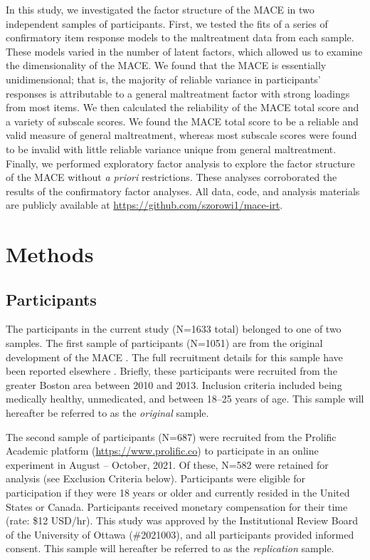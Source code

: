 \documentclass[letterpaper,man,natbib,floatsintext,longtable]{apa6}
\begin{document}
In this study, we investigated the factor structure of the MACE in two independent samples of participants. First, we tested the fits of a series of confirmatory item response models to the maltreatment data from each sample. These models varied in the number of latent factors, which allowed us to examine the dimensionality of the MACE. We found that the MACE is essentially unidimensional; that is, the majority of reliable variance in participants' responses is attributable to a general maltreatment factor with strong loadings from most items. We then calculated the reliability of the MACE total score and a variety of subscale scores. We found the MACE total score to be a reliable and valid measure of general maltreatment, whereas most subscale scores were found to be invalid with little reliable variance unique from general maltreatment. Finally, we performed exploratory factor analysis to explore the factor structure of the MACE without \textit{a priori} restrictions. These analyses corroborated the results of the confirmatory factor analyses. All data, code, and analysis materials are publicly available at \url{https://github.com/szorowi1/mace-irt}.

\section{Methods}

\subsection{Participants}

The participants in the current study (N=1633 total) belonged to one of two samples. The first sample of participants (N=1051) are from the original development of the MACE \citep{teicher2015maltreatment}. The full recruitment details for this sample have been reported elsewhere \citep{teicher2015maltreatment}. Briefly, these participants were recruited from the greater Boston area between 2010 and 2013. Inclusion criteria included being medically healthy, unmedicated, and between 18–25 years of age. This sample will hereafter be referred to as the \textit{original} sample. 

The second sample of participants (N=687) were recruited from the Prolific Academic platform (\url{https://www.prolific.co}) to participate in an online experiment in August -- October, 2021. Of these, N=582 were retained for analysis (see Exclusion Criteria below). Participants were eligible for participation if they were 18 years or older and currently resided in the United States or Canada. Participants received monetary compensation for their time (rate: \$12 USD/hr). This study was approved by the Institutional Review Board of the University of Ottawa (\#2021003), and all participants provided informed consent. This sample will hereafter be referred to as the \textit{replication} sample. 
\end{document}
